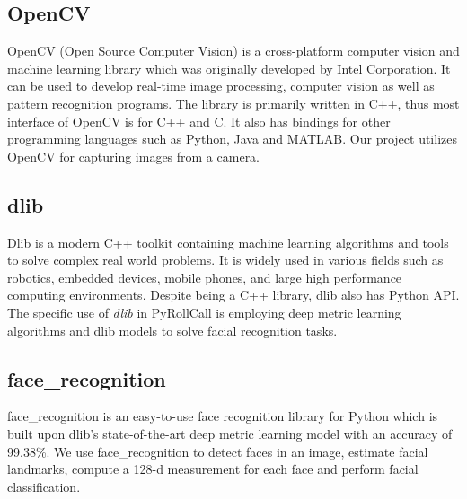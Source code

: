 
\subsection{OpenCV}  %
OpenCV (Open Source Computer Vision) is a cross-platform computer vision and machine learning library which was
originally developed by Intel Corporation. It can be used to develop real-time image processing, computer vision
as well as pattern recognition programs. The library is primarily written in C++, thus most interface of
OpenCV is for C++ and C. It also has bindings for other programming languages such as Python, Java and MATLAB.
Our project utilizes OpenCV for capturing images from a camera.

\subsection{dlib}  %
Dlib is a modern C++ toolkit containing machine learning algorithms and tools to solve complex real world problems.
It is widely used in various fields such as robotics, embedded devices, mobile phones, and large high performance
computing environments. Despite being a C++ library, dlib also has Python API. The specific use of \emph{dlib}
in PyRollCall is employing deep metric learning algorithms and dlib models to solve facial recognition tasks.

\subsection{face\_recognition}  %
face\_recognition is an easy-to-use face recognition library for Python which is built upon dlib's state-of-the-art
deep metric learning model with an accuracy of 99.38\%. We use face\_recognition to detect faces in an image,
estimate facial landmarks, compute a 128-d measurement for each face and perform facial classification.
